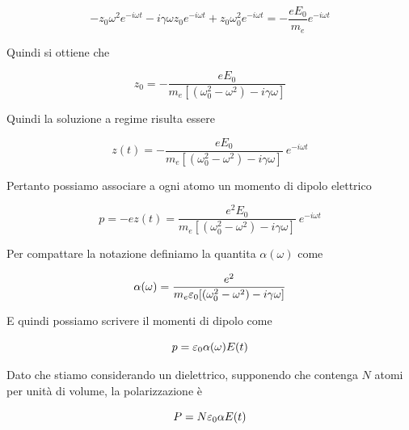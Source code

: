 \begin{equation}
    -z_0 \omega^2 e^{-i\omega t} - i \gamma \omega z_0 e^{-i\omega t} + z_0 \omega_0^2 e^{-i\omega t} = -\frac{e E_0}{m_e} e^{-i\omega t}
\end{equation}

Quindi si ottiene che 

\begin{equation}
    z_0 = - \frac{e E_0}{m_e [(\omega_0^2 - \omega^2) - i\gamma \omega]}
\end{equation}

Quindi la soluzione a regime risulta essere 

\begin{tcolorbox}[colback=yellow!10!white, colframe=orange!70!black, boxrule=0.8pt]
\begin{equation}
    z(t) = - \frac{e E_0}{m_e [(\omega_0^2 - \omega^2) - i\gamma \omega]} \ e^{-i\omega t}
\end{equation}
\end{tcolorbox}

Pertanto possiamo associare a ogni atomo un momento di dipolo elettrico 

\begin{equation}
    p = -e z(t) = \frac{e^2 E_0}{m_e [(\omega_0^2 - \omega^2) - i\gamma \omega]} \ e^{-i\omega t}
\end{equation}

Per compattare la notazione definiamo la quantita $\alpha(\omega)$ come 

\begin{tcolorbox}[colback=yellow!10!white, colframe=orange!70!black, boxrule=0.8pt]
\begin{equation}
    \alpha(\omega) = \frac{e^2}{m_e \varepsilon_0 [(\omega_0^2 - \omega^2) - i\gamma \omega]}
\end{equation}
\end{tcolorbox}

E quindi possiamo scrivere il momenti di dipolo come 

\begin{equation}
    p = \varepsilon_0 \alpha(\omega) E(t)
\end{equation}

Dato che stiamo considerando un dielettrico, supponendo che contenga $N$ atomi per unità di volume, la polarizzazione è 

\begin{equation}
    P = N \varepsilon_0 \alpha E(t)
\end{equation}

